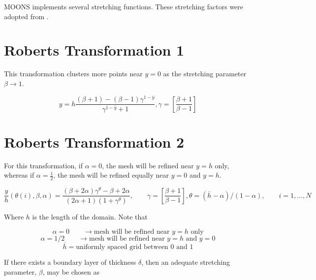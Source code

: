 \documentclass[11pt]{article}
\newcommand{\gammadef}{\left[\frac{\beta+1}{\beta-1}\right]}
\newcommand{\g}{\gamma}
\begin{document}
\doublespacing
\MOONSTITLE
\maketitle

MOONS implements several stretching functions. These stretching factors were adopted from \cite{pletcher2012computational}.

\section{Roberts Transformation 1}

This transformation clusters more points near $y=0$ as the stretching parameter $\beta \rightarrow 1$.

\begin{equation}
	y = h \frac{(\beta+1)-(\beta-1) \g^{1-\bar{y}} } {\g^{1-\bar{y}}+1}, \g = \gammadef
\end{equation}

\section{Roberts Transformation 2}
For this transformation, if $\alpha=0$, the mesh will be refined near $y=h$ only, whereas if $\alpha= \frac{1}{2}$, the mesh will be refined equally near $y=0$ and $y=h$.

\begin{equation} \label{eq:T2}
	\frac{y}{h}(\theta(i),\beta,\alpha) = \frac{ (\beta + 2 \alpha) \g^{\theta} - \beta + 2 \alpha}
	{ (2\alpha+1) \left(1+\g^{\theta} \right) }
	, \qquad \g = \gammadef, \theta = (\bar{h}-\alpha)/(1-\alpha)
	, \qquad i=1,...,N
\end{equation}

Where $h$ is the length of the domain. Note that

\begin{equation}
	\alpha = 0 \qquad \rightarrow \text{mesh will be refined near $y=h$ only}
\end{equation}
\begin{equation}
	\alpha = 1/2 \qquad \rightarrow \text{mesh will be refined near $y=h$ and $y=0$}
\end{equation}
\begin{equation}
	\bar{h} = \text{uniformly spaced grid between 0 and 1}
\end{equation}

If there exists a boundary layer of thickness $\delta$, then an adequate stretching parameter, $\beta$, may be chosen as
\end{document}
